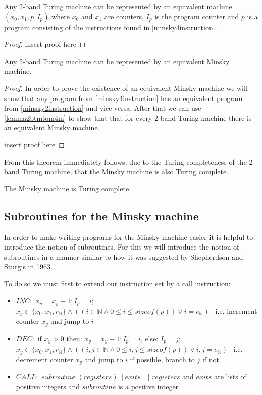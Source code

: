 \begin{lemma}
\label{lemma2btmtom4m}
Any 2-band Turing machine can be represented by an equivalent machine $(x_0, x_1, p, I_p)$ where $x_0$ and $x_1$ are counters, $I_p$ is the program counter and $p$ is a program consisting of the instructions found in \autoref{minsky4instruction}.
\begin{proof}
insert proof here
\end{proof}
\end{lemma}
\begin{theorem}
Any 2-band Turing machine can be represented by an equivalent Minsky machine.
\begin{proof}
In order to prove the existence of an equivalent Minsky machine we will show that any program from \autoref{minsky4instruction} has an equivalent program from \autoref{minsky2instruction} and vice versa. After that we can use \autoref{lemma2btmtom4m} to show that that for every 2-band Turing machine there is an equivalent Minsky machine.

insert proof here
\end{proof}
\end{theorem}
From this theorem immediately follows, due to the Turing-completeness of the 2-band Turing machine, that the Minsky machine is also Turing complete.
\begin{corollary}
The Minsky machine is Turing complete.
\end{corollary}

\subsection{Subroutines for the Minsky machine}
In order to make writing programs for the Minsky machine easier it is helpful to introduce the notion of subroutines.
For this we will introduce the notion of subroutines in a manner similar to how it was suggested by Shepherdson and Sturgis in 1963\cite{Shepherdson:1963:CRF:321160.321170}.

To do so we must first to extend our instruction set by a call instruction:
\begin{instructionset}
\label{minskycallinstruction}
\hfill
\begin{itemize}
\item{$INC:$} $x_y = x_y + 1; I_p = i$; \\
$ x_y\in\{x_0,x_1, r_{\mathbb{N}}\} \land ((i \in \mathbb{N} \land 0 \leq i \leq sizeof(p)) \lor i=e_{\mathbb{N}})$\hfill\break -- i.e. increment counter $x_y$ and jump to $i$
\item{$DEC:$} if $x_y > 0$ then: $x_y = x_y - 1; I_p = i$, else: $I_p = j$;
\\ $x_y\in\{x_0,x_1, r_{\mathbb{N}}\} \land ((i,j \in \mathbb{N} \land 0 \leq i,j \leq sizeof(p)) \lor i,j=e_{\mathbb{N}})$\hfill\break -- i.e. decrement counter $x_y$ and jump to $i$ if possible, branch to $j$ if not
\item{$CALL:$} $subroutine$ $(registers)$ $[exits]$ | $registers$ and $exits$ are lists of positive integers and $subroutine$ is a positive integer
\end{itemize}
\end{instructionset}

